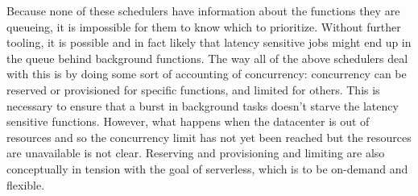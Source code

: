 Because none of these schedulers have information about the functions they are
queueing, it is impossible for them to know which to prioritize. Without further
tooling, it is possible and in fact likely that latency sensitive jobs might end
up in the queue behind background functions. The way all of the above schedulers
deal with this is by doing some sort of accounting of concurrency: concurrency
can be reserved or provisioned for specific functions, and limited for others.
This is necessary to ensure that a burst in background tasks doesn't starve the
latency sensitive functions. However, what happens when the datacenter is out of
resources and so the concurrency limit has not yet been reached but the
resources are unavailable is not clear. Reserving and provisioning and limiting
are also conceptually in tension with the goal of serverless, which is to be
on-demand and flexible.









